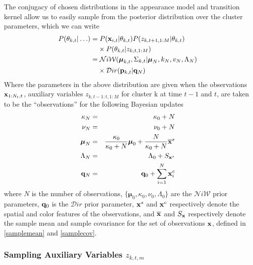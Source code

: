 \documentclass[twocolumn, final]{svjour3}
\begin{document}
The conjugacy of chosen distributions in the appearance model and transition kernel allow us to easily sample from the posterior distribution over the cluster parameters, which we can write
\begin{align}
\begin{split}
P(\theta_{k,t} | \ldots ) = & \hspace{1mm} P(\bold{x}_{i,t} | \theta_{k,t}) P(z_{k,t+1,1:M} | \theta_{k,t})
\\ & \times P(\theta_{k,t} | z_{k,t,1:M}) \\
 = & \hspace{1mm} \mathcal{N}i\mathcal{W}(\boldsymbol{\mu}_{k,t}, \Sigma_{k,t} | \boldsymbol{\mu}_{N}, k_{N}, v_{N}, \Lambda_{N}) \\
  & \times \mathcal{D}ir( \bold{p}_{k,t} | \bold{q}_{N})
\end{split}
\end{align}
Where the parameters in the above distribution are given when the observations $\bold{x}_{1:N_{t},t}$, auxiliary variables $z_{k,t-1:t,1:M}$ for cluster k at time $t-1$ and $t$, are taken to be the ``observations'' for the following Bayesian updates
\begin{eqnarray}
\label{bayesian_update_1}
\kappa_{N} &=& \kappa_{0} + N \\
\label{bayesian_update_2}
\nu_{N} &=& \nu_{0} + N \\
\label{bayesian_update_3}
\boldsymbol{\mu}_{N} &=& \frac{\kappa_{0}}{\kappa_{0}+N} \boldsymbol{\mu}_{0}  +  \frac{N}{\kappa_{0}+N} \overline{\bold{x}}^{s}\\
\Lambda_{N} &=& \Lambda_{0} + S_{\bold{x}^{s}}\\
\label{bayesian_update_4}
\bold{q}_{N} &=& \bold{q}_{0} + \sum_{i=1}^{N} \bold{x}_{i}^{c}
\end{eqnarray}
where $N$ is the number of observations, $\{ \boldsymbol{\mu}_{0}, \kappa_{0}, \nu_{0}, \Lambda_{0} \}$ are the $\mathcal{N}i\mathcal{W}$ prior parameters, $\bold{q}_{0}$ is the $\mathcal{D}ir$ prior parameter, $\bold{x}^{s}$ and $\bold{x}^{c}$ respectively denote the spatial and color features of the observations, and $\overline{\bold{x}}$ and $S_{\bold{x}}$ respectively denote the sample mean and sample covariance for the set of observations $\bold{x}$, defined in \eqref{samplemean} and \eqref{samplecov}.




\subsubsection{Sampling Auxiliary Variables $z_{k,t,m}$}
\label{sec:sample_aux_vars}
\end{document}
